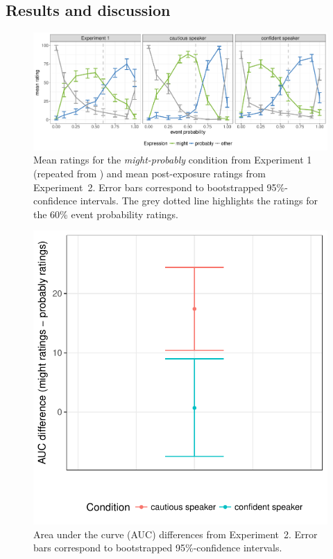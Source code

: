 \subsection{Results and discussion}

\begin{figure}
\includegraphics[width=\textwidth]{plots/fig-8-exp-1-replication-ratings.pdf}
\caption{Mean ratings for the \textit{might-probably} condition from Experiment 1 (repeated from ) and mean post-exposure ratings from Experiment~2. Error bars correspond to bootstrapped 95\%-confidence intervals.  The grey dotted line highlights the ratings for the 60\% event probability ratings.  \label{fig:adaptation-results-prod}}
\end{figure}

\begin{figure}
\center
\includegraphics[width=.4\textwidth]{plots/fig-9-exp-1-auc.pdf}
\caption{Area under the curve (AUC) differences from Experiment~2. Error bars correspond to bootstrapped 95\%-confidence intervals.  \label{fig:adaptation-auc-prod}}
\end{figure}

